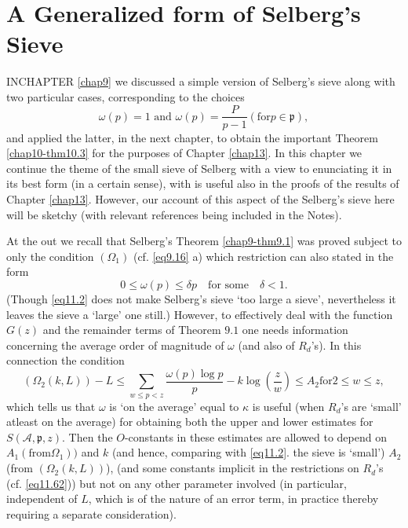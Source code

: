
\chapter{A Generalized form of Selberg's Sieve}\label{chap11}%

IN\pageoriginale CHAPTER \ref{chap9} we discussed a simple version of
Selberg's sieve along with two particular cases, corresponding to the
choices 
\begin{equation*}
 \omega(p) = 1 \text{ and } \omega(p) = \frac{P}{p-1} (\text{for} p \in
 \mathfrak{p}),\tag{11.1}\label{eq11.1} 
\end{equation*}
and applied the latter, in the next chapter, to obtain the important
Theorem \ref{chap10-thm10.3} for the purposes of Chapter
\ref{chap13}. In this chapter we 
continue the theme of the small sieve of Selberg with a view to
enunciating it in its best form (in a certain sense), with is useful
also in the proofs of the results of Chapter \ref{chap13}. However, our
account of this aspect of the Selberg's sieve here will be sketchy
(with relevant references being included in the Notes). 

At the out we recall that Selberg's Theorem \ref{chap9-thm9.1} was
proved subject 
to only the condition $(\Omega_1)$ (cf. \eqref{eq9.16} a) which
restriction can also stated in the form   
\begin{equation*}
0 \le \omega (p) \le \delta p\quad \text{for some}\quad \delta <
1.\tag{11.2} \label{eq11.2} 
\end{equation*}
(Though \eqref{eq11.2} does not make Selberg's sieve `too large a
sieve', nevertheless it leaves the sieve a `large' one still.)
However, to effectively deal with the function $G(z)$ and the
remainder terms of Theorem $9.1$ one needs information concerning the
average order of magnitude of $\omega$ (and also of $R_d$'s). In this
connection the condition  
 \begin{equation*}
(\Omega_2 (k, L))  -L \le \sum_{w \le p < z} \frac{\omega (p) \log
     p}{p} - k \log (\frac{z}{w}) \le A_2 \text{for} 2 \le w \le
   z,\tag{11.3}\label{eq11.3} 
\end{equation*}
which tells us that $\omega$ is `on the average' equal to $\kappa$ is
useful (when $R_d$'s are `small' atleast on the average) for obtaining
both the upper and lower estimates for\pageoriginale 
$S(\mathscr{A}, \mathfrak{p}
,z)$. Then the $O$-constants in these estimates are allowed to depend on
$A_1 (\text{from}\Omega_1))$ and $k$ (and hence, comparing with
\eqref{eq11.2}. the sieve is `small') $A_2$ (from $(\Omega_2(k, L))$), (and
some constants implicit in the restrictions on $R_d$'s
(cf. \eqref{eq11.62})) 
but not on any other parameter involved (in particular, independent of
$L$, which is of the nature of an error term, in practice thereby
requiring a separate consideration). 

